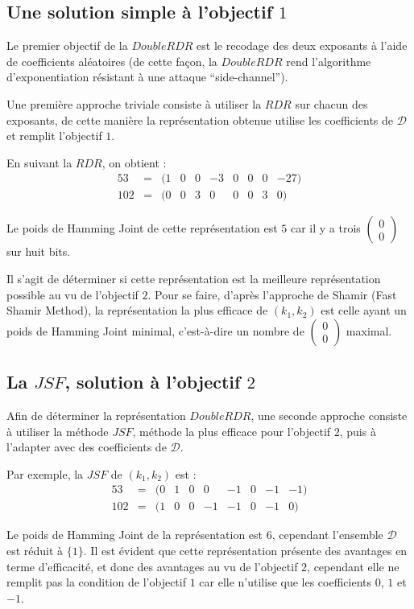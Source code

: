 \documentclass[12pt, a4paper]{memoir}
\newcommand{\doublezero}{\begin{pmatrix} 0 \\ 0 \end{pmatrix}}
\begin{document}
\subsection{Une solution simple à l'objectif $1$}

Le premier objectif de la $DoubleRDR$ est le recodage des deux exposants à l'aide de coefficients aléatoires
(de cette façon, la $DoubleRDR$ rend l'algorithme d'exponentiation résistant à une attaque ``side-channel'').

Une première approche triviale consiste à utiliser la $RDR$ sur chacun des exposants, de cette manière 
la représentation obtenue utilise les coefficients de $\mathcal{D}$ et remplit l'objectif $1$.

En suivant la $RDR$, on obtient : \\
  $$\begin{array}{cccccccccc}
  53 & = & (1 & 0 & 0 & -3 & 0 & 0 & 0 & -27) \\
  102 & = & (0 & 0 & 3 & 0 & 0 & 0 & 3 & 0)
 \end{array}$$

 Le poids de Hamming Joint de cette représentation est $5$ car il y a trois $\doublezero$ sur huit bits.
 
 Il s'agit de déterminer si cette représentation est la meilleure représentation possible au vu de l'objectif $2$.
 Pour se faire, d'après l'approche de Shamir (Fast Shamir Method), la représentation la plus efficace de $(k_1,k_2)$
 est celle ayant un poids de Hamming Joint minimal, c'est-à-dire un nombre de $\doublezero$ maximal.

\subsection{La $JSF$, solution à l'objectif $2$}

Afin de déterminer la représentation $DoubleRDR$, une seconde approche consiste à utiliser la méthode $JSF$,
méthode la plus efficace pour l'objectif $2$, puis à l'adapter avec des coefficients de $\mathcal{D}$.

Par exemple, la $JSF$ de $(k_1,k_2)$ est : \\
  $$\begin{array}{cccccccccc}
  53 & = & (0 & 1 & 0 & 0 & -1 & 0 & -1 & -1) \\
  102 & = & (1 & 0 & 0 & -1 & -1 & 0 & -1 & 0)
 \end{array}$$
 
 Le poids de Hamming Joint de la représentation est $6$, cependant l'ensemble $\mathcal{D}$ est réduit
 à $\{1\}$. Il est évident que cette représentation présente des avantages en terme d'efficacité, et donc
 des avantages au vu de l'objectif $2$, cependant elle ne remplit pas la condition de l'objectif $1$ car elle
 n'utilise que les coefficients $0$, $1$ et $-1$.
 
\end{document}
